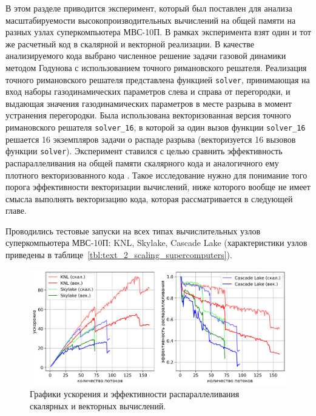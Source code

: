 В этом разделе приводится эксперимент, который был поставлен для анализа масштабируемости высокопроизводительных вычислений на общей памяти на разных узлах суперкомпьютера МВС-10П.
В рамках эксперимента взят один и тот же расчетный код в скалярной и векторной реализации.
В качестве анализируемого кода выбрано численное решение задачи газовой динамики методом Годунова с использованием точного римановского решателя.
Реализация точного римановского решателя \cite{riemannvecGithub} представлена функцией \texttt{solver}, принимающая на вход наборы газодинамических параметров слева и справа от перегородки, и выдающая значения газодинамических параметров в месте разрыва в момент устранения перегородки.
Была использована векторизованная версия точного римановского решателя \texttt{solver\_16}, в которой за один вызов функции \texttt{solver\_16} решается 16 экземпляров задачи о распаде разрыва (векторизуется 16 вызовов функции \texttt{solver}).
Эксперимент ставился с целью сравнить эффективность распараллеливания на общей памяти скалярного кода и аналогичного ему плотного векторизованного кода \cite{Vorobyov2020ParVec,Vorobyov2020Scaling}.
Такое исследование нужно для понимание того порога эффективности векторизации вычислений, ниже которого вообще не имеет смысла выполнять векторизацию кода, которая рассматривается в следующей главе.

Проводились тестовые запуски на всех типах вычислительных узлов суперкомпьютера МВС-10П: KNL\label{abbr:knl-4}, Skylake, Cascade Lake (характеристики узлов приведены в таблице~\ref{tbl:text_2_scaling_supercomputers}).

\begin{figure}[ht]
\centering
\includegraphics[width=1.0\textwidth]{fig/par_openmp_scalar_vec_chart_big.png}
\singlespacing
\caption{Графики ускорения и эффективности распараллеливания \\ скалярных и векторных вычислений.}
\label{fig:text_3_omp2}
\end{figure}

